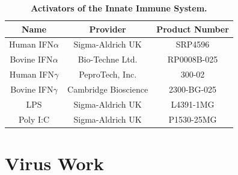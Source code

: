 \begin{table}
\centering
\begin{tabular}{ccc}
\hline
\textbf{Name} & \textbf{Provider}    & \textbf{Product Number} \\ \hline
Human IFN\(\alpha\)    & Sigma-Aldrich UK     & SRP4596                 \\ \hline
Bovine IFN\(\alpha\)   & Bio-Techne Ltd.      & RP0008B-025             \\ \hline
Human IFN\(\gamma\)    & PeproTech, Inc.      & 300-02                  \\ \hline
Bovine IFN\(\gamma\)   & Cambridge Bioscience & 2300-BG-025             \\ \hline
LPS           & Sigma-Aldrich UK     & L4391-1MG               \\ \hline
Poly I:C      & Sigma-Aldrich UK     & P1530-25MG              \\ \hline
\end{tabular}
\caption[Activators of the Innate Immune System.]{\textbf{Activators of the Innate Immune System.}}
\label{tab:Activators of the Innate Immune System Table}
\end{table}




\section{Virus Work} \label{sec:Virus Work}

